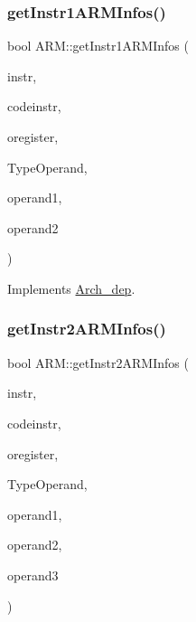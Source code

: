 \subsubsection{\texorpdfstring{get\+Instr1\+A\+R\+M\+Infos()}{getInstr1ARMInfos()}}
{\footnotesize\ttfamily bool A\+R\+M\+::get\+Instr1\+A\+R\+M\+Infos (\begin{DoxyParamCaption}\item[{string \&}]{instr,  }\item[{string \&}]{codeinstr,  }\item[{string \&}]{oregister,  }\item[{\hyperlink{arch_8h_a63b66e201ffc27bbc8f89c8808382044}{offset\+Type} $\ast$}]{Type\+Operand,  }\item[{string \&}]{operand1,  }\item[{string \&}]{operand2 }\end{DoxyParamCaption})\hspace{0.3cm}{\ttfamily [virtual]}}



Implements \hyperlink{classArch__dep_a30cdbcdc129741df876bda79fd76e9fe}{Arch\+\_\+dep}.

\mbox{\label{classARM_a4a8d73d140cf70b7fb73d0359d9c52d0}} 
\subsubsection{\texorpdfstring{get\+Instr2\+A\+R\+M\+Infos()}{getInstr2ARMInfos()}}
{\footnotesize\ttfamily bool A\+R\+M\+::get\+Instr2\+A\+R\+M\+Infos (\begin{DoxyParamCaption}\item[{string \&}]{instr,  }\item[{string \&}]{codeinstr,  }\item[{string \&}]{oregister,  }\item[{\hyperlink{arch_8h_a63b66e201ffc27bbc8f89c8808382044}{offset\+Type} $\ast$}]{Type\+Operand,  }\item[{string \&}]{operand1,  }\item[{string \&}]{operand2,  }\item[{string \&}]{operand3 }\end{DoxyParamCaption})\hspace{0.3cm}{\ttfamily [virtual]}}



